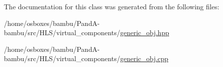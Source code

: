 The documentation for this class was generated from the following files\+:\begin{DoxyCompactItemize}
\item 
/home/osboxes/bambu/\+Pand\+A-\/bambu/src/\+H\+L\+S/virtual\+\_\+components/\hyperlink{generic__obj_8hpp}{generic\+\_\+obj.\+hpp}\item 
/home/osboxes/bambu/\+Pand\+A-\/bambu/src/\+H\+L\+S/virtual\+\_\+components/\hyperlink{generic__obj_8cpp}{generic\+\_\+obj.\+cpp}\end{DoxyCompactItemize}
